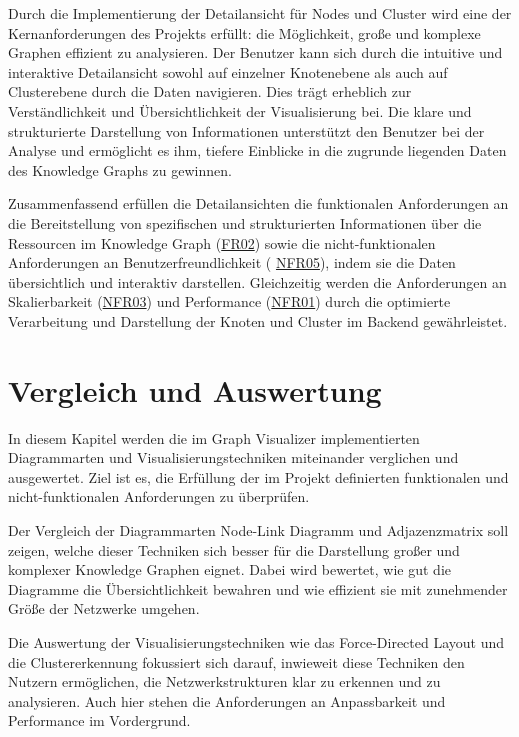 Durch die Implementierung der Detailansicht für Nodes und Cluster wird eine der Kernanforderungen des Projekts erfüllt: die Möglichkeit, große und komplexe Graphen effizient zu analysieren. Der Benutzer kann sich durch die intuitive und interaktive Detailansicht sowohl auf einzelner Knotenebene als auch auf Clusterebene durch die Daten navigieren. Dies trägt erheblich zur Verständlichkeit und Übersichtlichkeit der Visualisierung bei. Die klare und strukturierte Darstellung von Informationen unterstützt den Benutzer bei der Analyse und ermöglicht es ihm, tiefere Einblicke in die zugrunde liegenden Daten des Knowledge Graphs zu gewinnen.

Zusammenfassend erfüllen die Detailansichten die funktionalen Anforderungen an die Bereitstellung von spezifischen und strukturierten Informationen über die Ressourcen im Knowledge Graph (\hyperref[FR02]{FR02}) sowie die nicht-funktionalen Anforderungen an Benutzerfreundlichkeit ( \hyperref[NFR05]{NFR05}), indem sie die Daten übersichtlich und interaktiv darstellen. Gleichzeitig werden die Anforderungen an Skalierbarkeit (\hyperref[NFR03]{NFR03}) und Performance (\hyperref[NFR01]{NFR01}) durch die optimierte Verarbeitung und Darstellung der Knoten und Cluster im Backend gewährleistet.

\section{Vergleich und Auswertung}
\label{realization:comparison}

In diesem Kapitel werden die im Graph Visualizer implementierten Diagrammarten und Visualisierungstechniken miteinander verglichen und ausgewertet. Ziel ist es, die Erfüllung der im Projekt definierten funktionalen und nicht-funktionalen Anforderungen zu überprüfen.

Der Vergleich der Diagrammarten Node-Link Diagramm und Adjazenzmatrix soll zeigen, welche dieser Techniken sich besser für die Darstellung großer und komplexer Knowledge Graphen eignet. Dabei wird bewertet, wie gut die Diagramme die Übersichtlichkeit bewahren und wie effizient sie mit zunehmender Größe der Netzwerke umgehen.

Die Auswertung der Visualisierungstechniken wie das Force-Directed Layout und die Clustererkennung fokussiert sich darauf, inwieweit diese Techniken den Nutzern ermöglichen, die Netzwerkstrukturen klar zu erkennen und zu analysieren. Auch hier stehen die Anforderungen an Anpassbarkeit und Performance im Vordergrund.

